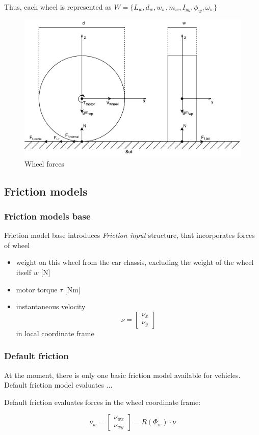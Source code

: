 \documentclass[a4paper,11pt]{article}
\begin{document}
Thus, each wheel is represented as $W = \{L_w, d_w, w_w, m_w, I_{yy}, \phi_w, \omega_w\}$

\begin{figure}[h!]
  \centerline{\includegraphics[width=0.7\linewidth]{imgs/wheel_forces}}
  \caption{Wheel forces}
  \label{fig:wheel_forces}
\end{figure}


\subsection{Friction models}
\subsubsection{Friction models base}
Friction model base introduces \textit{Friction input} structure, that incorporates forces of wheel
\begin{itemize}
\item weight on this wheel from the car chassis, excluding the weight of the wheel itself $w$ [N]
\item motor torque $\tau$ [Nm]
\item instantaneous velocity 
\[\nu = \begin{bmatrix}
\nu_x \\
\nu_y
\end{bmatrix}\] in local coordinate frame
\end{itemize}

\subsubsection{Default friction}
At the moment, there is only one basic friction model available for vehicles.
Default friction model evaluates ...

Default friction evaluates forces in the wheel coordinate frame:

\begin{center}
\[
\nu_w = 
\begin{bmatrix}
\nu_{wx} \\
\nu_{wy}
\end{bmatrix}
=R(\Phi_w) \cdot \nu
\]
\end{center}
\end{document}
